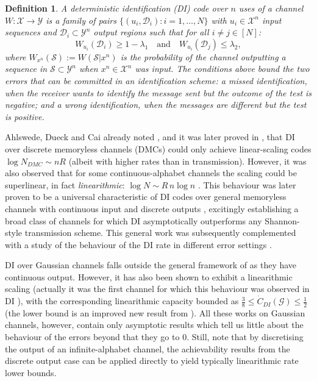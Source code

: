 \documentclass[10pt,conference]{IEEEtran}
\newtheorem{definition}[theorem]{Definition}
\newcommand{\1}{\mathds{1}}
\newcommand{\cD}{\mathcal{D}}
\newcommand{\cG}{\mathcal{G}}
\newcommand{\cS}{\mathcal{S}}
\newcommand{\cX}{\mathcal{X}}
\newcommand{\cY}{\mathcal{Y}}
\begin{document}
\begin{definition}\label{def:DI_code}
A \emph{deterministic identification (DI)} code over $n$ uses of a channel $W:\cX\to\cY$ is a family of pairs $\{(u_i,\cD_i) : i=1,\dots,N\}$ with $u_i\in\cX^n$ input sequences and $\cD_i\subset\cY^n$ output regions such that for all $i\neq j\in [N]$:
\[
  W_{u_i}(\cD_i)\ge 1-\lambda_1 \quad\text{and}\quad W_{u_i}(\cD_j)\le\lambda_2,
\]
where $W_{x^n}(\cS):=W(\cS|x^n)$ is the probability of the channel outputting a sequence in $\cS\subset\cY^n$ when $x^n\in\cX^n$ was input. The conditions above bound the two errors that can be committed in an identification scheme: a \emph{missed identification}, when the receiver wants to identify the message sent but the outcome of the test is negative; and a \emph{wrong identification}, when the messages are different but the test is positive.
\end{definition}

Ahlswede, Dueck and Cai already noted \cite{AD:ID_ViaChannels,AC:DI}, and it was later proved in \cite{SPBD:DI_power}, that DI over discrete memoryless channels (DMCs) could only achieve linear-scaling codes $\log N_{DMC}\sim nR$ (albeit with higher rates than in transmission). However, it was also observed that for some continuous-alphabet channels the scaling could be superlinear, in fact \emph{linearithmic}: $\log N\sim R\,n\log n$ \cite{SPBD:DI_power,DI-poisson_mc,DI-fading}. This behaviour was later proven to be a universal characteristic of DI codes over general memoryless channels with continuous input and discrete outputs \cite{CDBW:DI_classical}, excitingly establishing a broad class of channels for which DI asymptotically outperforms any Shannon-style transmission scheme. This general work was subsequently complemented with a study of the behaviour of the DI rate in different error settings \cite{CDBW:Reliability_ICC,CDBW:Reliability-TCOM,DI-steins}.

DI over Gaussian channels falls outside the general framework of \cite{CDBW:DI_classical,CDBW:Reliability-TCOM} as they have continuous output. However, it has also been shown to exhibit a linearithmic scaling (actually it was the first channel for which this behaviour was observed in DI \cite{SPBD:DI_power,DI-fading}), with the corresponding linearithmic capacity bounded as $\frac38\leq\dot{C}_{DI}(\cG)\le\frac12$ (the lower bound is an improved new result from \cite{galaxy-codes}). All these works on Gaussian channels, however, contain only asymptotic results which tell us little about the behaviour of the errors beyond that they go to $0$. Still, note that by discretising the output of an infinite-alphabet channel, the achievability results from the discrete output case \cite{CDBW:DI_classical,CDBW:Reliability-TCOM} can be applied directly to yield typically linearithmic rate lower bounds.
\end{document}
